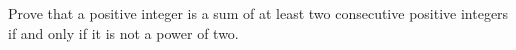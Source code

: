 Prove that a positive integer is a sum of at least two consecutive positive integers if and only if it is not a power of two.
